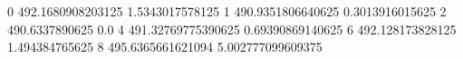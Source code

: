 0 492.1680908203125 1.5343017578125
1 490.9351806640625 0.3013916015625
2 490.6337890625 0.0
4 491.32769775390625 0.69390869140625
6 492.128173828125 1.494384765625
8 495.6365661621094 5.002777099609375
